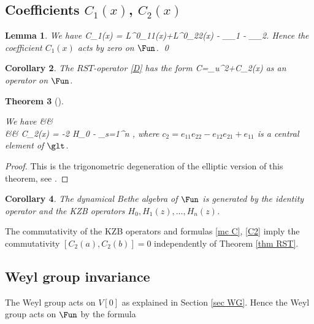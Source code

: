 \documentclass[12pt]{amsart}
\newtheorem{thm}{Theorem}[section]
\newtheorem{cor}[thm]{Corollary}
\newtheorem{lem}[thm]{Lemma}
\numberwithin{equation}{section}
\theoremstyle{definition}
\let\mc\mathcal
\let\la\lambda
\let\der\partial
\def\L{{\mc L}}
\begin{document}
\subsection{Coefficients $C_1(x)$, $C_2(x)$}


\begin{lem} 
We have
\bea
C_1(x) = \L^0_{11}(x)+\L^0_{22}(x) - \partial_{\la_1} - \partial_{\la_2}.
\eea
Hence the coefficient $C_1(x)$ acts by zero  on $\Fun$. 
\qed
\end{lem}

\begin{cor} The $RST$-operator \eqref{D} has the form
\bean
\label{mc C}
\mc C=\der_u^2+C_2(x)
\eean
as an operator on $\Fun$.
\end{cor}

\begin{thm} [\cite{ThV}]  
\label{S_2(X)} 

We have 
\bean
\label{C2}
&&
\\
&&
\notag
C_2(x) = -2\pi {} H_0 - \sum_{s=1}^n 
,
\eean
where $c_2 = e_{11}e_{22} - e_{12}e_{21} + e_{11}$ is a central element of $\glt$.
\end{thm}



\begin{proof}
This is the trigonometric degeneration of the elliptic version of this theorem, see 
  \cite[Theorem 4.9]{ThV}.
\end{proof}

\begin{cor} The dynamical Bethe algebra of $\Fun$ is generated by the identity operator and
the KZB operators $H_0, H_1(z), \dots, H_n(z)$.

\end{cor}

The commutativity of the KZB operators and formulas \eqref{mc C}, 
\eqref{C2} imply the commutativity $[C_2(a),C_2(b)]=0$  independently of  Theorem  
\ref{thm RST}.





\subsection{Weyl group invariance}
\label{sec Wgi}


The Weyl group acts on  $V[0]$
as explained in Section \ref{sec WG}.
Hence the Weyl group acts on $\Fun$  by the formula
\end{document}
